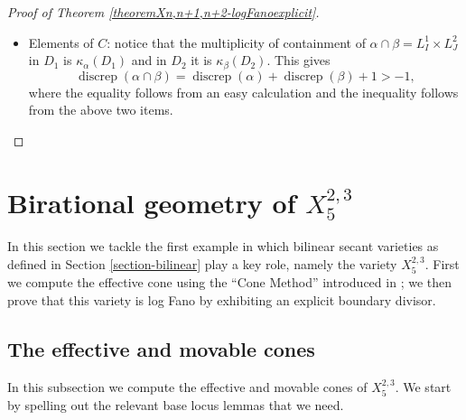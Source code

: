 \documentclass[a4paper,11pt]{article}
\newcommand{\discrep}{\operatorname{discrep}}
\begin{document}
\begin{proof}[Proof of Theorem \ref{theoremXn,n+1,n+2-logFanoexplicit}]
\begin{itemize}
\item Elements of $C$: notice that the multiplicity of containment of $\alpha\cap\beta =L^1_I\times L^2_J$ in $D_1$ is $\kappa_\alpha(D_1)$ and in $D_2$ it is $\kappa_\beta(D_2)$. This gives 
$$
\discrep(\alpha\cap\beta)=
\discrep(\alpha)+\discrep(\beta)+1>-1,
$$
where the equality follows from an easy calculation and the inequality follows from the above two items.
\end{itemize}
\end{proof}

\section{Birational geometry of \texorpdfstring{$X^{2,3}_5$}{X{2,3}5}}
\label{section-X235}

In this section we tackle the first example in which bilinear secant varieties as defined in Section \ref{section-bilinear} play a key role, namely the variety $X^{2,3}_5$. First we compute the effective cone using the ``Cone Method'' introduced in \cite{GPP21}; we then prove that this variety is log Fano by exhibiting an explicit boundary divisor. 

\subsection{The effective and movable cones}

In this subsection we compute the effective and movable cones of $X^{2,3}_5$. We start by spelling out the relevant base locus lemmas that we need. 
\end{document}
